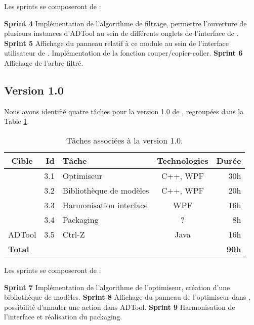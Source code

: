 		Les sprints se composeront de :
		
		\textbf{Sprint 4} Implémentation de l'algorithme de filtrage, permettre l'ouverture de plusieurs instances d'ADTool au sein de différents onglets de l'interface de \glasir{}.\newline 
		\textbf{Sprint 5} Affichage du panneau relatif à ce module au sein de l'interface utilisateur de \glasir{}. Implémentation de la fonction couper/copier-coller.\newline %
		\textbf{Sprint 6} Affichage de l'arbre filtré.

	\subsection{Version 1.0}
		Nous avons identifié quatre tâches pour la version 1.0 de \glasir{}, regroupées dans la {\sc Table} \ref{tab:taches_units_3}.
		\begin{table}[h]
			\centering
			\begin{tabular}{|c|r|l|c|r|}
				\hline
				\textbf{Cible} & \textbf{Id} & \textbf{Tâche} & \textbf{Technologies} & \textbf{Durée}\\
				\hline

				\multirow{4}{*}{\glasir{}} & 3.1 & Optimiseur & C++, WPF & 30h\\
				\cline{2-5}
				 & 3.2 & Bibliothèque de modèles & C++, WPF & 20h\\
				\cline{2-5}
				 & 3.3 & Harmonisation interface & WPF & 16h\\
				\cline{2-5}
				 & 3.4 & Packaging & ? & 8h\\
				\hline

				\multirow{1}{*}{ADTool} & 3.5 & Ctrl-Z & \multirow{1}{*}{Java} & 16h\\
				\hline

				\multicolumn{4}{|l|}{\bf Total} & {\bf 90h}\\
				\hline
			\end{tabular}
			\caption{Tâches associées à la version 1.0.}
			\label{tab:taches_units_3}
		\end{table}
		
		Les sprints se composeront de :		
		
		\textbf{Sprint 7} Implémentation de l'algorithme de l'optimiseur, création d'une bibliothèque de modèles.\newline
		\textbf{Sprint 8} Affichage du panneau de l'optimiseur dans \glasir{}, possibilité d'annuler une action dans ADTool.\newline
		\textbf{Sprint 9} Harmonisation de l'interface et réalisation du packaging. \newline
